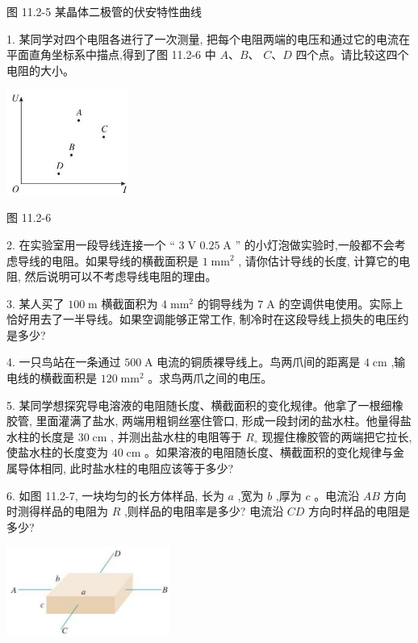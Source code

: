 \documentclass[10pt]{article}
\begin{document}
图 11.2-5 某晶体二极管的伏安特性曲线

1. 某同学对四个电阻各进行了一次测量, 把每个电阻两端的电压和通过它的电流在平面直角坐标系中描点,得到了图 11.2-6 中 \(A\text{、}B\text{、}\) \(C\text{、}D\) 四个点。请比较这四个电阻的大小。

\begin{center}
\includegraphics[max width=0.3\textwidth]{images/01911d5f-8e38-70c0-b5b8-2b399bd115b6_66_293480.jpg}
\end{center}

图 11.2-6

2. 在实验室用一段导线连接一个 “ \(3\mathrm{\;V}\) \({0.25}\mathrm{\;A}\) ” 的小灯泡做实验时,一般都不会考虑导线的电阻。如果导线的横截面积是 \(1{\mathrm{\;{mm}}}^{2}\) , 请你估计导线的长度, 计算它的电阻, 然后说明可以不考虑导线电阻的理由。

3. 某人买了 \({100}\mathrm{\;m}\) 横截面积为 \(4{\mathrm{\;{mm}}}^{2}\) 的铜导线为 \(7\mathrm{\;A}\) 的空调供电使用。实际上恰好用去了一半导线。如果空调能够正常工作, 制冷时在这段导线上损失的电压约是多少?

4. 一只鸟站在一条通过 \({500}\mathrm{\;A}\) 电流的铜质裸导线上。鸟两爪间的距离是 \(4\mathrm{\;{cm}}\) ,输电线的横截面积是 \({120}{\mathrm{\;{mm}}}^{2}\) 。求鸟两爪之间的电压。

5. 某同学想探究导电溶液的电阻随长度、横截面积的变化规律。他拿了一根细橡胶管, 里面灌满了盐水, 两端用粗铜丝塞住管口, 形成一段封闭的盐水柱。他量得盐水柱的长度是 \({30}\mathrm{\;{cm}}\) , 并测出盐水柱的电阻等于 \({R}_{ \circ }\) 现握住橡胶管的两端把它拉长,使盐水柱的长度变为 \({40}\mathrm{\;{cm}}\) 。如果溶液的电阻随长度、横截面积的变化规律与金属导体相同, 此时盐水柱的电阻应该等于多少?

6. 如图 11.2-7, 一块均匀的长方体样品, 长为 \(a\) ,宽为 \(b\) ,厚为 \(c\) 。电流沿 \({AB}\) 方向时测得样品的电阻为 \(R\) ,则样品的电阻率是多少? 电流沿 \({CD}\) 方向时样品的电阻是多少?

\begin{center}
\includegraphics[max width=0.4\textwidth]{images/01911d5f-8e38-70c0-b5b8-2b399bd115b6_66_571104.jpg}
\end{center}
\end{document}
